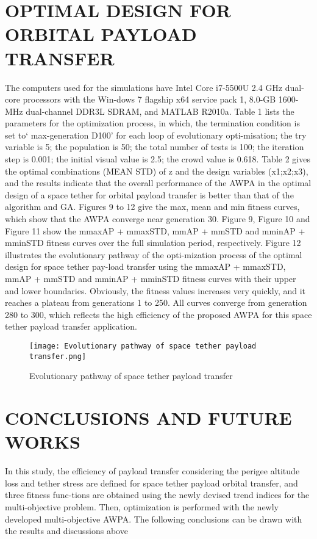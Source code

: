 \documentclass[conference]{IEEEtran}
\begin{document}
\section{OPTIMAL DESIGN FOR ORBITAL PAYLOAD
TRANSFER}
The computers used for the simulations have Intel Core
i7-5500U 2.4 GHz dual-core processors with the Win-dows 7 flagship x64 service pack 1, 8.0-GB 1600-MHz
dual-channel DDR3L SDRAM, and MATLAB R2010a.
Table 1 lists the parameters for the optimization
process, in which, the termination condition is set to`
max-generation D100' for each loop of evolutionary opti-misation; the try variable is 5; the population is 50; the total
number of tests is 100; the iteration step is 0.001; the initial
visual value is 2.5; the crowd value is 0.618.
Table 2 gives the optimal combinations (MEAN STD) of
z and the design variables (x1;x2;x3), and the results indicate
that the overall performance of the AWPA in the optimal design of a space tether for orbital payload transfer is better
than that of the algorithm and GA.
Figures 9 to 12 give the max, mean and min fitness curves,
which show that the AWPA converge near generation 30.
Figure 9, Figure 10 and Figure 11 show the mmaxAP
+ mmaxSTD, mmAP + mmSTD and mminAP + mminSTD
fitness curves over the full simulation period, respectively.
Figure 12 illustrates the evolutionary pathway of the opti-mization process of the optimal design for space tether pay-load transfer using the mmaxAP + mmaxSTD, mmAP +
mmSTD and mminAP + mminSTD fitness curves with their
upper and lower boundaries.
Obviously, the fitness values increases very quickly, and
it reaches a plateau from generations 1 to 250. All curves
converge from generation 280 to 300, which reflects the
high efficiency of the proposed AWPA for this space tether
payload transfer application.

\begin{figure}[H]
\centering
\begin{minipage}{0.4\textwidth}
    \texttt{[image: Evolutionary pathway of space tether payload transfer.png]}
    \caption{Evolutionary pathway of space tether payload transfer}
\end{minipage}
\end{figure}

\section{CONCLUSIONS AND FUTURE WORKS}
In this study, the efficiency of payload transfer considering
the perigee altitude loss  and tether stress  are defined for
space tether payload orbital transfer, and three fitness func-tions are obtained using the newly devised trend indices for the multi-objective problem. Then, optimization is performed
with the newly developed multi-objective AWPA.
The following conclusions can be drawn with the results
and discussions above
\end{document}
